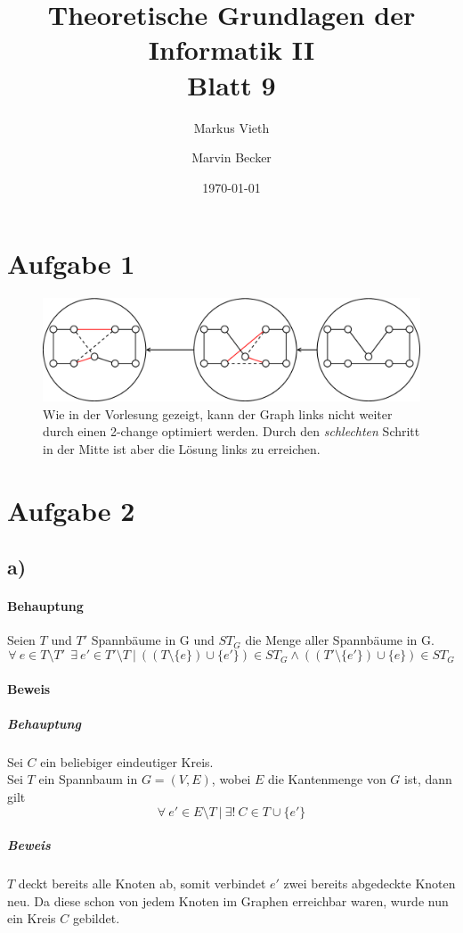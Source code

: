 \documentclass[a4paper,11pt,twoside]{scrartcl}
\title{Theoretische Grundlagen der Informatik II\\ Blatt 9}
\author{Markus Vieth \and Marvin Becker}
\date{\today}
\newcounter{beweis}
\begin{document}
\maketitle
\cleardoublepage
\pagestyle{myheadings}

\section*{Aufgabe 1}
\begin{figure}[h]
\centering
\includegraphics[width=1\linewidth]{Grafik/Aufgabe1}
\caption{Wie in der Vorlesung gezeigt, kann der Graph links nicht weiter durch einen 2-change optimiert werden. Durch den \textit{schlechten} Schritt in der Mitte ist aber die Lösung links zu erreichen.}
\label{fig:Aufgabe1}
\end{figure}
\section*{Aufgabe 2}
\subsection*{a)}
\paragraph{Behauptung}
Seien $T$ und $T'$ Spannbäume in G und $ST_G$ die Menge aller Spannbäume in G.\\
\[ \forall~e\in T\setminus T'~~\exists~e'\in T'\setminus T~|~((T\setminus  \{e\})\cup \{e'\}) \in ST_G \land ((T'\setminus \{e'\})\cup \{e\}) \in ST_G \]
\paragraph{Beweis}
\subparagraph{ Behauptung}
Sei $C$ ein beliebiger eindeutiger Kreis.\\
Sei $T$ ein Spannbaum in $G=(V,E)$, wobei $E$ die Kantenmenge von $G$ ist, dann gilt 
\[ \forall~ e'\in E\setminus T ~|~ \exists!~ C\in T\cup \{e'\} \]
\subparagraph{ Beweis}
$T$ deckt bereits alle Knoten ab, somit verbindet $e'$ zwei bereits abgedeckte Knoten neu. Da diese schon von jedem Knoten im Graphen erreichbar waren, wurde nun ein Kreis $C$ gebildet.
\end{document}
